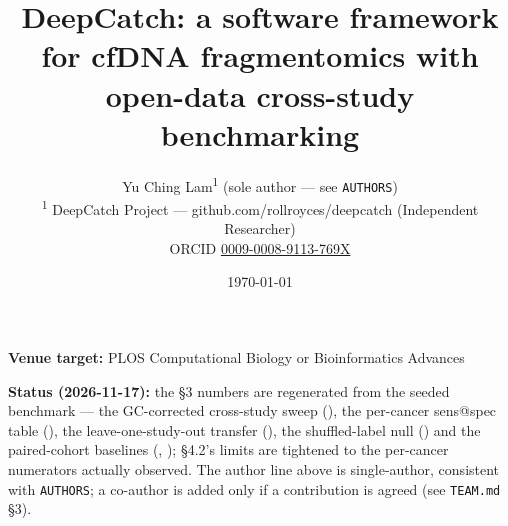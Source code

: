 \documentclass[11pt]{article}
\title{DeepCatch: a software framework for cfDNA fragmentomics with open-data cross-study benchmarking}
\author{Yu Ching Lam\textsuperscript{1} (sole author --- see \texttt{AUTHORS}) \\
\textsuperscript{1} DeepCatch Project --- github.com/rollroyces/deepcatch (Independent Researcher) \\
ORCID \href{https://orcid.org/0009-0008-9113-769X}{0009-0008-9113-769X}}
\date{\today}
\begin{document}
\maketitle
{\small
\textbf{Venue target:} PLOS Computational Biology or Bioinformatics Advances

\textbf{Status (2026-11-17):} the \S{}3 numbers are regenerated from the seeded benchmark --- the GC-corrected cross-study sweep (), the per-cancer sens@spec table (), the leave-one-study-out transfer (), the shuffled-label null () and the paired-cohort baselines (, ); \S{}4.2's limits are tightened to the per-cancer numerators actually observed. The author line above is single-author, consistent with \texttt{AUTHORS}; a co-author is added only if a contribution is agreed (see \texttt{TEAM.md} \S{}3).

\par}
\end{document}
